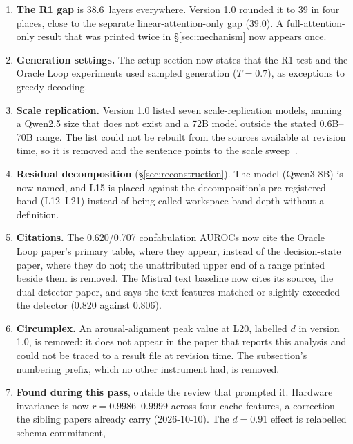 \documentclass[11pt,a4paper]{article}
\begin{document}
\begin{enumerate}[nosep,leftmargin=*]
  $l/n_\text{layers}$ throughout. Recomputed: spectral half-rise 27.5\%,
  J-lens half-rise 87.8\%, 60\% of the network between them, R3 onset
  21.9\% (still about 3 points below the pre-registered window), and
  the R3 stable-rank peak 29.7\%, which version 1.0 placed inside the
  31--33\% band. It is just below it.
\item \textbf{The R1 gap} is 38.6~layers everywhere. Version 1.0
  rounded it to 39 in four places, close to the separate
  linear-attention-only gap (39.0). A full-attention-only result that
  was printed twice in \S\ref{sec:mechanism} now appears once.
\item \textbf{Generation settings.} The setup section now states that
  the R1 test and the Oracle Loop experiments used sampled generation
  ($T{=}0.7$), as exceptions to greedy decoding.
\item \textbf{Scale replication.} Version 1.0 listed seven
  scale-replication models, naming a Qwen2.5 size that does not exist
  and a 72B model outside the stated 0.6B--70B range. The list could not
  be rebuilt from the sources available at revision time, so it is
  removed and the sentence
  points to the scale sweep~\citep{lyra2026campaign2}.
\item \textbf{Residual decomposition} (\S\ref{sec:reconstruction}). The
  model (Qwen3-8B) is now named, and L15 is placed against the
  decomposition's pre-registered band (L12--L21) instead of being called
  workspace-band depth without a definition.
\item \textbf{Citations.} The 0.620/0.707 confabulation AUROCs now cite
  the Oracle Loop paper's primary table, where they appear, instead of
  the decision-state paper, where they do not; the unattributed upper
  end of a range printed beside them is removed. The Mistral text
  baseline now cites its source, the dual-detector paper, and says the
  text features matched or slightly exceeded the detector (0.820
  against 0.806).
\item \textbf{Circumplex.} An arousal-alignment peak value at L20,
  labelled $d$ in version 1.0, is removed: it does not appear in the
  paper that reports this analysis and could not be traced to a result
  file at revision time. The subsection's numbering prefix, which no other instrument
  had, is removed.
\item \textbf{Found during this pass}, outside the review that prompted
  it. Hardware invariance is now $r = 0.9986$--$0.9999$ across four
  cache features, a correction the sibling papers already carry
  (2026-10-10). The $d = 0.91$ effect is relabelled schema commitment,

\end{enumerate}
\end{document}
